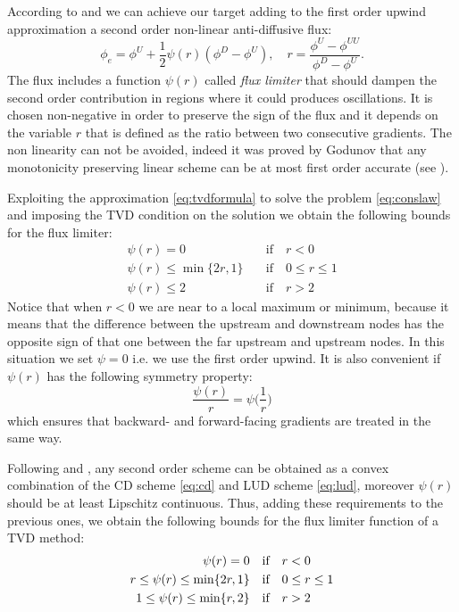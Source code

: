 According to \cite{tvd:sweeby} and \cite{main:darwish} we can achieve our 
target adding to the first order upwind approximation a second order 
non-linear 
anti-diffusive flux: 
\begin{equation} \label{eq:tvdformula}
\phi_e = \phi^U + \frac{1}{2}\psi(r)(\phi^D - \phi^U), \quad r = 
\frac{\phi^U - \phi^{UU}}{\phi^D - \phi^U}.
\end{equation}
The flux includes a function $\psi(r)$ called \emph{flux limiter} that should 
dampen the second order contribution in regions where it could produces 
oscillations. It is chosen non-negative in order to preserve the sign of the 
flux and it depends on the variable $r$ that is defined as the ratio between 
two consecutive gradients. The non linearity can not be avoided, indeed it was 
proved by Godunov that any monotonicity preserving linear scheme can be at 
most 
first order accurate (see \cite{tvd:godunov}).

Exploiting the approximation \eqref{eq:tvdformula} to solve the problem 
\eqref{eq:conslaw} and imposing the TVD condition on the solution we obtain 
the 
following bounds for the flux limiter:
\begin{align}
\psi(r) = 0 \quad &\text{if} \quad r < 0\\
\psi(r) \leq \min \{2r, 1\} \quad &\text{if} \quad 0 \leq r \leq 1\\
\psi(r) \leq 2 \quad &\text{if} \quad r > 2
\end{align}
Notice that when $r<0$ we are near to a local maximum or minimum, because it 
means that the difference between the upstream and downstream nodes has the 
opposite sign of that one between the far upstream and upstream nodes. In this 
situation we set $\psi = 0$ i.e. we use the first order upwind.
It is also convenient if $\psi(r)$ has the following symmetry property:
\begin{equation}
\frac{\psi(r)}{r} = \psi\bigg(\frac{1}{r}\bigg)
\end{equation}
which ensures that backward- and forward-facing gradients are treated in the 
same way.

Following \cite{tvd:sweeby} and \cite{tvd:vanleer}, any second order scheme 
can 
be obtained as a convex combination of the CD scheme \eqref{eq:cd} and LUD 
scheme \eqref{eq:lud}, moreover $\psi(r)$ should be at least Lipschitz 
continuous. Thus, adding these requirements to the previous ones, we obtain 
the 
following bounds for the flux limiter function of a TVD method:
\begin{align}
\psi(r) = 0 \quad &\text{if} \quad r < 0 \notag \\
\label{tvd:bounds} r \leq \psi(r) \leq \min \{2r, 1\} \quad &\text{if} \quad 0 
\leq r \leq 1\\
1 \leq \psi(r) \leq \min \{r, 2 \} \quad &\text{if} \quad r > 2 \notag
\end{align}

